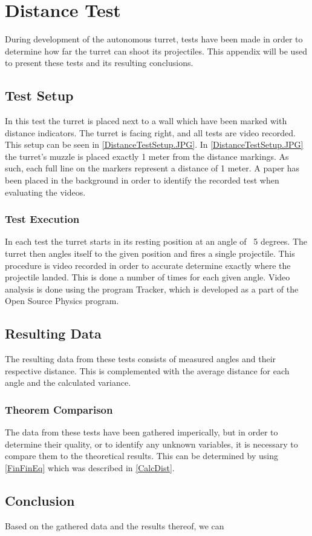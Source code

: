 \chapter{Distance Test}
During development of the autonomous turret, tests have been made in order to
determine how far the turret can shoot its projectiles. This appendix will be
used to present these tests and its resulting conclusions.

\section{Test Setup}
In this test the turret is placed next to a wall which have been marked with
distance indicators. The turret is facing right, and all tests are video
recorded. This setup can be seen in \autoref{DistanceTestSetup.JPG}.
 In \autoref{DistanceTestSetup.JPG} the turret's muzzle is placed exactly 1 meter
from the distance markings. As such, each full line on the markers represent a
distance of 1 meter. A paper has been placed in the background in order to
identify the recorded test when evaluating the videos.

\subsection{Test Execution}
In each test the turret starts in its resting position at an angle of ~5
degrees. The turret then angles itself to the given position and fires a single
projectile. This procedure is video recorded in order to accurate determine
exactly where the projectile landed. This is done a number of times for each
given angle. Video analysis is done using the program Tracker, which is
developed as a part of the Open Source Physics program.

\section{Resulting Data}
The resulting data from these tests consists of measured angles and their
respective distance. This is complemented with the average distance for each
angle and the calculated variance.


\subsection{Theorem Comparison}
The data from these tests have been gathered imperically, but in order to
determine their quality, or to identify any unknown variables, it is necessary
to compare them to the theoretical results. This can be determined by using
\autoref{FinFinEq} which was described in \autoref{CalcDist}. 


\section{Conclusion}
Based on the gathered data and the results thereof, we can 
